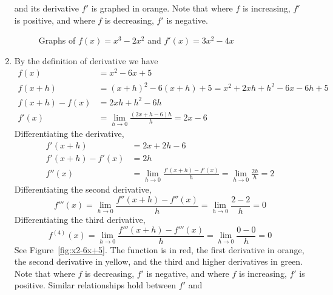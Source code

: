 \documentclass{article}
\begin{document}
\begin{enumerate}
  and its derivative \(f'\) is graphed in orange.  Note that where
  \(f\) is increasing, \(f'\) is positive, and where \(f\) is
  decreasing, \(f'\) is negative.
  \begin{figure}[htbp]
    \centering
    \caption{Graphs of $f(x)=x^3-2x^2$ and $f'(x)=3x^2-4x$}
    \label{fig:x3-2x2}
  \end{figure}
\item By the definition of derivative we have
  \begin{align*}
    f(x) &= x^2 - 6x + 5 \\
    f(x+h) &= (x+h)^2-6(x+h)+5 = x^2 +2xh + h^2 - 6x - 6h + 5 \\
    f(x+h)-f(x) &= 2xh + h^2 - 6h \\
    f'(x) &= \lim_{h\to 0} \frac{(2x+h-6)h}{h} = 2x-6
  \end{align*}
  Differentiating the derivative,
  \begin{align*}
    f'(x+h) &= 2x+2h-6 \\
    f'(x+h)-f'(x) &= 2h \\
    f''(x) &= \lim_{h\to 0} \frac{f'(x+h)-f'(x)}{h} 
    = \lim_{h\to 0} \frac{2h}{h} = 2
  \end{align*}
  Differentiating the second derivative,
  \begin{equation*}
    f'''(x) = \lim_{h\to 0} \frac{f''(x+h)-f''(x)}{h} 
    = \lim_{h\to 0} \frac{2-2}{h} = 0
  \end{equation*}
  Differentiating the third derivative,
  \begin{equation*}
    f^{(4)} (x) = \lim_{h\to 0} \frac{f'''(x+h)-f'''(x)}{h}
    = \lim_{h\to 0} \frac{0-0}{h} = 0
  \end{equation*}
  See Figure~\ref{fig:x2-6x+5}.  The function is in red, the first
  derivative in orange, the second derivative in yellow, and the third
  and higher derivatives in green.  Note that where \(f\) is
  decreasing, \(f'\) is negative, and where \(f\) is increasing,
  \(f'\) is positive.  Similar relationships hold between \(f'\) and

\end{enumerate}
\end{document}
